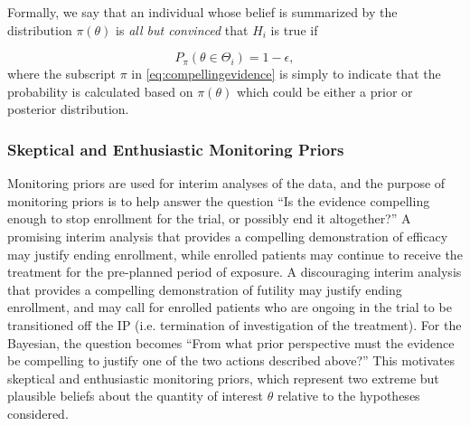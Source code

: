 \documentclass[12pt]{article}
\begin{document}
Formally, we say that an individual whose belief is summarized by the distribution $\pi\left(\theta\right)$ is \textit{all but convinced} that $H_i$ is true if 

\begin{equation}\label{eq:compellingevidence}
		P_\pi(\theta\in\Theta_i) = 1-\epsilon,
\end{equation} 
where the subscript $\pi$ in \eqref{eq:compellingevidence} is simply to indicate that the probability is calculated based on $\pi\left(\theta\right)$ which could be either a prior
or posterior distribution.

\subsubsection{Skeptical and Enthusiastic Monitoring Priors}\label{sec:MP}
Monitoring priors are used for interim analyses of the data, and the purpose of monitoring priors is to help answer the question ``Is the evidence compelling enough to stop enrollment for the trial, or possibly end it altogether?''
%
A promising interim analysis that provides a compelling demonstration of efficacy may justify ending enrollment, while enrolled patients may continue to receive the treatment for the pre-planned period of exposure. 
%
A discouraging interim analysis that provides a compelling demonstration of futility may justify ending enrollment, and may call for enrolled patients who are ongoing in the trial to be transitioned off the IP (i.e. termination of investigation of the treatment). 
%
For the Bayesian, the question becomes ``From what prior perspective must the evidence be compelling to justify one of the two actions described above?'' 
%
This motivates skeptical and enthusiastic monitoring priors, which represent two extreme but plausible beliefs about the quantity of interest $\theta$ relative to the hypotheses considered.
%
\end{document}
